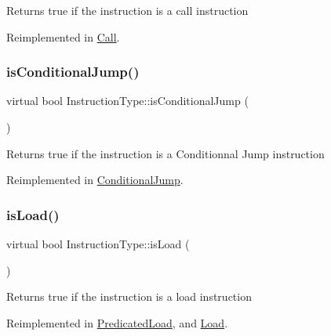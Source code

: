 Returns true if the instruction is a call instruction 

Reimplemented in \hyperlink{classCall_a2f33492c84abcac87ff5e388535f6cfb}{Call}.

\mbox{\label{classInstructionType_a3655591172fa6acbf7b9888e879b551d}} 
\subsubsection{\texorpdfstring{is\+Conditional\+Jump()}{isConditionalJump()}}
{\footnotesize\ttfamily virtual bool Instruction\+Type\+::is\+Conditional\+Jump (\begin{DoxyParamCaption}{ }\end{DoxyParamCaption})\hspace{0.3cm}{\ttfamily [virtual]}}

Returns true if the instruction is a Conditionnal Jump instruction 

Reimplemented in \hyperlink{classConditionalJump_a2341c5b034b189c24b858651a51d6dba}{Conditional\+Jump}.

\mbox{\label{classInstructionType_aa3d2c042a4109b1d96dc0d7f20916ba3}} 
\subsubsection{\texorpdfstring{is\+Load()}{isLoad()}}
{\footnotesize\ttfamily virtual bool Instruction\+Type\+::is\+Load (\begin{DoxyParamCaption}{ }\end{DoxyParamCaption})\hspace{0.3cm}{\ttfamily [virtual]}}

Returns true if the instruction is a load instruction 

Reimplemented in \hyperlink{classPredicatedLoad_a6eba0b6ea212b012d2015fb023804fc3}{Predicated\+Load}, and \hyperlink{classLoad_aa7fbffafad6cbfa1b9866f6d09cc7e30}{Load}.

\mbox{\label{classInstructionType_a5b28d5b2e495222817facca7b8826975}} 
